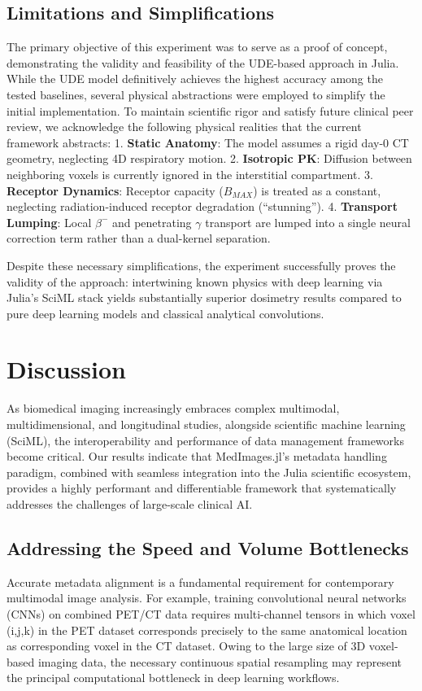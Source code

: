 \documentclass[a4paper,10pt]{elsarticle}
\begin{document}
\subsection{Limitations and Simplifications}
The primary objective of this experiment was to serve as a proof of concept, demonstrating the validity and feasibility of the UDE-based approach in Julia. While the UDE model definitively achieves the highest accuracy among the tested baselines, several physical abstractions were employed to simplify the initial implementation. To maintain scientific rigor and satisfy future clinical peer review, we acknowledge the following physical realities that the current framework abstracts:
1. \textbf{Static Anatomy}: The model assumes a rigid day-0 CT geometry, neglecting 4D respiratory motion.
2. \textbf{Isotropic PK}: Diffusion between neighboring voxels is currently ignored in the interstitial compartment.
3. \textbf{Receptor Dynamics}: Receptor capacity ($B_{MAX}$) is treated as a constant, neglecting radiation-induced receptor degradation (``stunning'').
4. \textbf{Transport Lumping}: Local $\beta^-$ and penetrating $\gamma$ transport are lumped into a single neural correction term rather than a dual-kernel separation.

Despite these necessary simplifications, the experiment successfully proves the validity of the approach: intertwining known physics with deep learning via Julia's SciML stack yields substantially superior dosimetry results compared to pure deep learning models and classical analytical convolutions.

\section{Discussion}

As biomedical imaging increasingly embraces complex multimodal, multidimensional, and longitudinal studies, alongside scientific machine learning (SciML), the interoperability and performance of data management frameworks become critical. Our results indicate that MedImages.jl’s metadata handling paradigm, combined with seamless integration into the Julia scientific ecosystem, provides a highly performant and differentiable framework that systematically addresses the challenges of large-scale clinical AI.

\subsection*{Addressing the Speed and Volume Bottlenecks}
Accurate metadata alignment is a fundamental requirement for contemporary multimodal image analysis. For example, training convolutional neural networks (CNNs) on combined PET/CT data requires multi-channel tensors in which voxel (i,j,k) in the PET dataset corresponds precisely to the same anatomical location as corresponding voxel in the CT dataset. Owing to the large size of 3D voxel-based imaging data, the necessary continuous spatial resampling may represent the principal computational bottleneck in deep learning workflows. 
\end{document}
